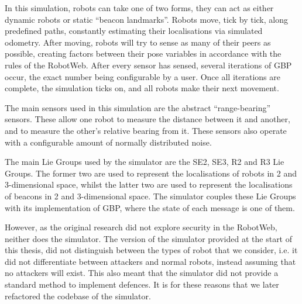 In this simulation, robots can take one of two forms, they can act as either dynamic robots or static ``beacon landmarks''. Robots move, tick by tick, along predefined paths, constantly estimating their localisations via simulated odometry. After moving, robots will try to sense as many of their peers as possible, creating factors between their pose variables in accordance with the rules of the RobotWeb. After every sensor has sensed, several iterations of GBP occur, the exact number being configurable by a user. Once all iterations are complete, the simulation ticks on, and all robots make their next movement.

The main sensors used in this simulation are the abstract ``range-bearing'' sensors. These allow one robot to measure the distance between it and another, and to measure the other's relative bearing from it. These sensors also operate with a configurable amount of normally distributed noise.

The main Lie Groups used by the simulator are the SE2, SE3, R2 and R3 Lie Groups. The former two are used to represent the localisations of robots in 2 and 3-dimensional space, whilst the latter two are used to represent the localisations of beacons in 2 and 3-dimensional space. The simulator couples these Lie Groups with its implementation of GBP, where the state of each message is one of them.

However, as the original research did not explore security in the RobotWeb, neither does the simulator. The version of the simulator provided at the start of this thesis, did not distinguish between the types of robot that we consider, i.e. it did not differentiate between attackers and normal robots, instead assuming that no attackers will exist. This also meant that the simulator did not provide a standard method to implement defences. It is for these reasons that we later refactored the codebase of the simulator.